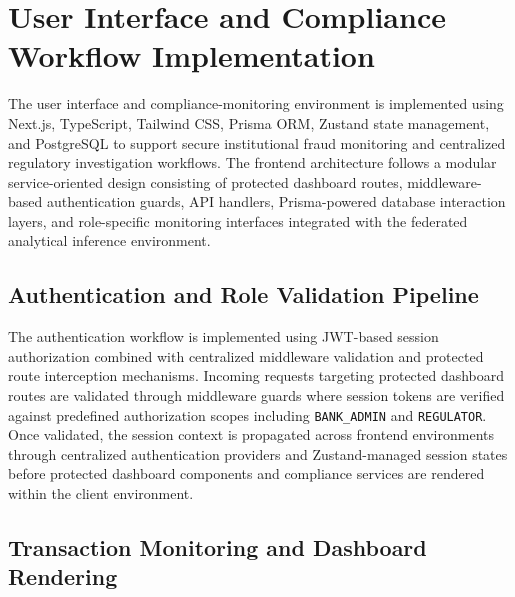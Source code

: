 \section[User Interface and Compliance Workflow Implementation]{\textbf{User Interface and Compliance Workflow Implementation}}

The user interface and compliance-monitoring environment is implemented using Next.js, TypeScript, Tailwind CSS, Prisma ORM, Zustand state management, and PostgreSQL to support secure institutional fraud monitoring and centralized regulatory investigation workflows. The frontend architecture follows a modular service-oriented design consisting of protected dashboard routes, middleware-based authentication guards, API handlers, Prisma-powered database interaction layers, and role-specific monitoring interfaces integrated with the federated analytical inference environment.

\subsection[Authentication and Role Validation Pipeline]{\textbf{Authentication and Role Validation Pipeline}}

The authentication workflow is implemented using JWT-based session authorization combined with centralized middleware validation and protected route interception mechanisms. Incoming requests targeting protected dashboard routes are validated through middleware guards where session tokens are verified against predefined authorization scopes including \texttt{BANK\_ADMIN} and \texttt{REGULATOR}. Once validated, the session context is propagated across frontend environments through centralized authentication providers and Zustand-managed session states before protected dashboard components and compliance services are rendered within the client environment.

\subsection[Transaction Monitoring and Dashboard Rendering]{\textbf{Transaction Monitoring and Dashboard Rendering}}

